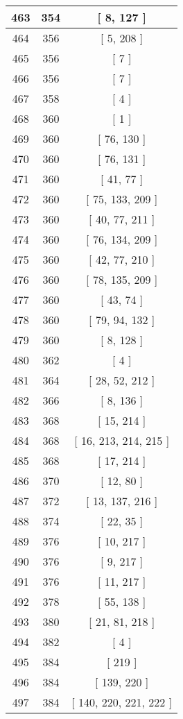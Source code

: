 \begin{center}
\begin{longtable}[H]{|| c c c ||}
\hline
463 & 354 & [ 8, 127 ] \\ 
\hline
464 & 356 & [ 5, 208 ] \\ 
\hline
465 & 356 & [ 7 ] \\ 
\hline
466 & 356 & [ 7 ] \\ 
\hline
467 & 358 & [ 4 ] \\ 
\hline
468 & 360 & [ 1 ] \\ 
\hline
469 & 360 & [ 76, 130 ] \\ 
\hline
470 & 360 & [ 76, 131 ] \\ 
\hline
471 & 360 & [ 41, 77 ] \\ 
\hline
472 & 360 & [ 75, 133, 209 ] \\ 
\hline
473 & 360 & [ 40, 77, 211 ] \\ 
\hline
474 & 360 & [ 76, 134, 209 ] \\ 
\hline
475 & 360 & [ 42, 77, 210 ] \\ 
\hline
476 & 360 & [ 78, 135, 209 ] \\ 
\hline
477 & 360 & [ 43, 74 ] \\ 
\hline
478 & 360 & [ 79, 94, 132 ] \\ 
\hline
479 & 360 & [ 8, 128 ] \\ 
\hline
480 & 362 & [ 4 ] \\ 
\hline
481 & 364 & [ 28, 52, 212 ] \\ 
\hline
482 & 366 & [ 8, 136 ] \\ 
\hline
483 & 368 & [ 15, 214 ] \\ 
\hline
484 & 368 & [ 16, 213, 214, 215 ] \\ 
\hline
485 & 368 & [ 17, 214 ] \\ 
\hline
486 & 370 & [ 12, 80 ] \\ 
\hline
487 & 372 & [ 13, 137, 216 ] \\ 
\hline
488 & 374 & [ 22, 35 ] \\ 
\hline
489 & 376 & [ 10, 217 ] \\ 
\hline
490 & 376 & [ 9, 217 ] \\ 
\hline
491 & 376 & [ 11, 217 ] \\ 
\hline
492 & 378 & [ 55, 138 ] \\ 
\hline
493 & 380 & [ 21, 81, 218 ] \\ 
\hline
494 & 382 & [ 4 ] \\ 
\hline
495 & 384 & [ 219 ] \\ 
\hline
496 & 384 & [ 139, 220 ] \\ 
\hline
497 & 384 & [ 140, 220, 221, 222 ] \\ 

\end{longtable}
\end{center}
